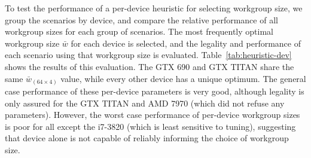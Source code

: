 \documentclass[nonatbib,preprint,10pt]{sigplanconf}
\begin{document}
To test the performance of a per-device heuristic for selecting
workgroup size, we group the scenarios by device, and compare the
relative performance of all workgroup sizes for each group of
scenarios. The most frequently optimal workgroup size $\bar{w}$ for
each device is selected, and the legality and performance of each
scenario using that workgroup size is evaluated.
Table~\ref{tab:heuristic-dev} shows the results of this evaluation.
The GTX 690 and GTX TITAN share the same $\bar{w}_{(64 \times 4)}$
value, while every other device has a unique optimum. The general case
performance of these per-device parameters is very good, although
legality is only assured for the GTX TITAN and AMD 7970 (which did not
refuse any parameters). However, the worst case performance of
per-device workgroup sizes is poor for all except the i7-3820 (which
is least sensitive to tuning), suggesting that device alone is not
capable of reliably informing the choice of workgroup size.



\end{document}

